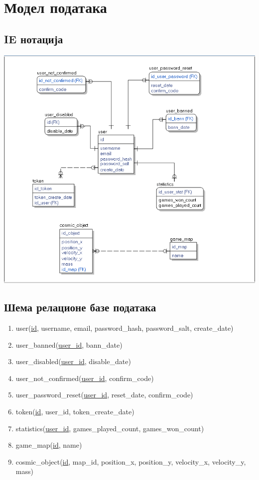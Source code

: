 \section{Модел података}

\subsection{IE нотација}

\includegraphics[width=\textwidth]{../resources/database-model.png}

\subsection{Шема релационе базе података}

\begin{enumerate}
    \item user(\underline{id}, username, email, password\_hash, password\_salt,
        create\_date)
    \item user\_banned(\underline{user\_id}, bann\_date)
    \item user\_disabled(\underline{user\_id}, disable\_date)
    \item user\_not\_confirmed(\underline{user\_id}, confirm\_code)
    \item user\_password\_reset(\underline{user\_id}, reset\_date, confirm\_code)
    \item token(\underline{id}, user\_id, token\_create\_date)
    \item statistics(\underline{user\_id}, games\_played\_count, games\_won\_count)
    \item game\_map(\underline{id}, name)
    \item cosmic\_object(\underline{id}, map\_id, position\_x, position\_y,
        velocity\_x, velocity\_y, mass)
\end{enumerate}



